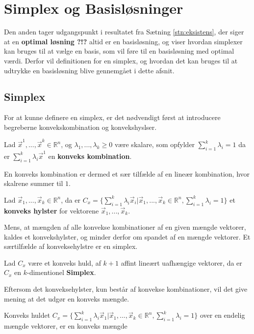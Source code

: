 \section{Simplex og Basisløsninger}
Den anden tager udgangspunkt i resultatet fra Sætning \ref{stn:eksistens}, der siger at en \textbf{optimal løsning ?!?} altid er en basisløsning, og viser hvordan simplexer kan bruges til at vælge en basis, som vil føre til en basisløsning med optimal værdi.
Derfor vil definitionen for en simplex, og hvordan det kan bruges til at udtrykke en basisløsning blive gennemgået i dette afsnit.
\subsection{Simplex}
For at kunne definere en simplex, er det nødvendigt først at introducere begreberne konvekskombination og konvekshyslser.
\begin{defn}
Lad $\vec{x}^1, ...,\vec{x}^k \in \mathds{R}^n$, og $\lambda_1,..., \lambda_k \geq 0 $ være skalare, som opfylder $\sum_{i=1}^k \lambda_i =1$ da er $\sum_{i=1}^k \lambda_i \vec{x}^1$ en \textbf{konveks kombination}.
\label{def:KonveksKombination}
\end{defn}
En konveks kombination er dermed et sær tilfælde af en lineær kombination, hvor skalrene summer til $1$.
\begin{defn}
Lad $\vec{x}_1, ...,\vec{x}_k \in \mathds{R}^n$, da er $C_{x} = \{\sum_{i=1}^k \lambda_i \vec{x}_i| \vec{x}_1, ...,\vec{x}_k \in \mathds{R}^n, \sum_{i=1}^k \lambda_i =1\}$ et \textbf{konveks hylster} for vektorene $\vec{x}_1, ...,\vec{x}_k$. 
\label{def:Konvekshuld}
\end{defn}
Mens, at mængden af alle konvekse kombinationer af en given mængde vektorer, kaldes et konvekshylster, og minder derfor om spandet af en mængde vektorer.
Et særtilfælde af konveksehylstre er en simplex.
\begin{defn}[Simplex]
Lad $C_x$ være et konveks huld, af $k+1$ affint lineært uafhængige vektorer, da er $C_x$ en $k$-dimentionel \textbf{Simplex}.
\end{defn}
Eftersom det konveksehylster, kun består af konvekse kombinationer, vil det give mening at det udgør en konveks mængde.
\begin{stn}
Konveks huldet $C_x = \{\sum_{i=1}^k \lambda_i \vec{x}_1| \vec{x}_1, ...,\vec{x}_k \in \mathds{R}^n, \sum_{i=1}^k \lambda_i =1\}$ over en endelig mængde vektorer, er en konveks mængde
\end{stn}
